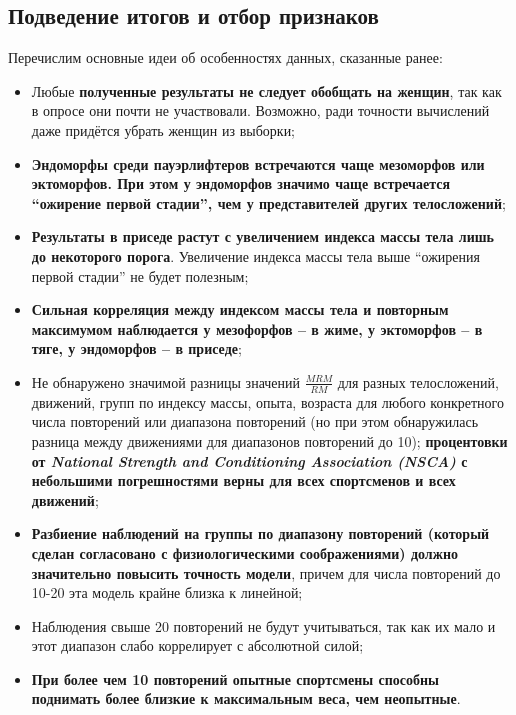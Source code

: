 \documentclass[
]{article}
\begin{document}
\hypertarget{ux43fux43eux434ux432ux435ux434ux435ux43dux438ux435-ux438ux442ux43eux433ux43eux432-ux438-ux43eux442ux431ux43eux440-ux43fux440ux438ux437ux43dux430ux43aux43eux432}{%
\subsection{Подведение итогов и отбор
признаков}\label{ux43fux43eux434ux432ux435ux434ux435ux43dux438ux435-ux438ux442ux43eux433ux43eux432-ux438-ux43eux442ux431ux43eux440-ux43fux440ux438ux437ux43dux430ux43aux43eux432}}

Перечислим основные идеи об особенностях данных, сказанные ранее:

\begin{itemize}
\item
  Любые \textbf{полученные результаты не следует обобщать на женщин},
  так как в опросе они почти не участвовали. Возможно, ради точности
  вычислений даже придётся убрать женщин из выборки;
\item
  \textbf{Эндоморфы среди пауэрлифтеров встречаются чаще мезоморфов или
  эктоморфов. При этом у эндоморфов значимо чаще встречается ``ожирение
  первой стадии'', чем у представителей других телосложений};
\item
  \textbf{Результаты в приседе растут с увеличением индекса массы тела
  лишь до некоторого порога}. Увеличение индекса массы тела выше
  ``ожирения первой стадии'' не будет полезным;
\item
  \textbf{Сильная корреляция между индексом массы тела и повторным
  максимумом наблюдается у мезофорфов -- в жиме, у эктоморфов -- в тяге,
  у эндоморфов -- в приседе};
\item
  Не обнаружено значимой разницы значений \(\frac{MRM}{RM}\) для разных
  телосложений, движений, групп по индексу массы, опыта, возраста для
  любого конкретного числа повторений или диапазона повторений (но при
  этом обнаружилась разница между движениями для диапазонов повторений
  до 10); \textbf{процентовки от \emph{National Strength and
  Conditioning Association (NSCA)} с небольшими погрешностями верны для
  всех спортсменов и всех движений};
\item
  \textbf{Разбиение наблюдений на группы по диапазону повторений
  (который сделан согласовано с физиологическими соображениями) должно
  значительно повысить точность модели}, причем для числа повторений до
  10-20 эта модель крайне близка к линейной;
\item
  Наблюдения свыше 20 повторений не будут учитываться, так как их мало и
  этот диапазон слабо коррелирует с абсолютной силой;
\item
  \textbf{При более чем 10 повторений опытные спортсмены способны
  поднимать более близкие к максимальным веса, чем неопытные}.
\end{itemize}
\end{document}
